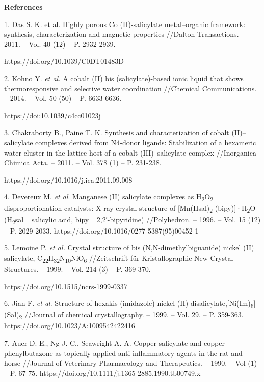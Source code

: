 \begin{center}
{\bfseries References}
\end{center}

\begin{noparindent}
1.
  Das S. K. et al. Highly porous Co (II)-salicylate metal--organic
  framework: synthesis, characterization and magnetic properties
  //Dalton Transactions. -- 2011. -- Vol. 40 (12) -- P. 2932-2939.

  https://doi.org/10.1039/C0DT01483D

2.
  Kohno Y. \emph{et al.} A cobalt (II) bis (salicylate)-based ionic
  liquid that shows thermoresponsive and selective water coordination
  //Chemical Communications. -- 2014. -- Vol. 50 (50) -- P. 6633-6636.

  https://doi:10.1039/c4cc01023j

3.
  Chakraborty B., Paine T. K. Synthesis and characterization of cobalt
  (II)--salicylate complexes derived from N4-donor ligands:
  Stabilization of a hexameric water cluster in the lattice host of a
  cobalt (III)--salicylate complex //Inorganica Chimica Acta. -- 2011.
  -- Vol. 378 (1) -- P. 231-238.

  https://doi.org/10.1016/j.ica.2011.09.008

4.
  Devereux M. \emph{et al}. Manganese (II) salicylate complexes as
  H\textsubscript{2}O\textsubscript{2} disproportionation catalysts:
  X-ray crystal structure of {[}Mn(Hsal)\textsubscript{2}
  (bipy){]}·H\textsubscript{2}O (H\textsubscript{2}sal= salicylic acid,
  bipy= 2,2′-bipyridine) //Polyhedron. -- 1996. -- Vol. 15 (12) -- P.
  2029-2033. https://doi.org/10.1016/0277-5387(95)00452-1

5.
  Lemoine P. \emph{et al.} Crystal structure of bis
  (N,N-dimethylbiguanide) nickel (II) salicylate,
  C\textsubscript{22}H\textsubscript{32}N\textsubscript{10}NiO\textsubscript{6}
  //Zeitschrift für Kristallographie-New Crystal Structures. -- 1999. --
  Vol. 214 (3) -- P. 369-370.

  https://doi.org/10.1515/ncrs-1999-0337

6.
  Jian F. \emph{et al}. Structure of hexakis (imidazole) nickel (II)
  disalicylate,{[}Ni(Im)\textsubscript{6}{]}(Sal)\textsubscript{2}
  //Journal of chemical crystallography. -- 1999. -- Vol. 29. -- P.
  359-363. https://doi.org/10.1023/A:1009542422416

7.
  Auer D. E., Ng J. C., Seawright A. A. Copper salicylate and copper
  phenylbutazone as topically applied anti‐inflammatory agents in the
  rat and horse //Journal of Veterinary Pharmacology and Therapeutics.
  -- 1990. -- Vol (1) -- P. 67-75.
  https://doi.org/10.1111/j.1365-2885.1990.tb00749.x


\end{noparindent}
